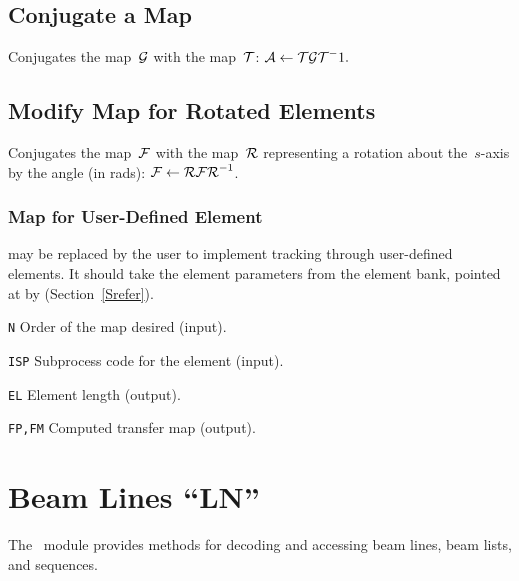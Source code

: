 \section{Conjugate a Map}
\label{LMSAND}
Conjugates the map~$\cal G$ with the map~$\cal T$:
${\cal A} \leftarrow {\cal T G T}^-1.$
 
\section{Modify Map for Rotated Elements}
\label{LMTILT}
Conjugates the map~$\cal F$ with the map~$\cal R$ representing a
rotation about the~$s$-axis by the angle  (in rads):
${\cal F} \leftarrow {\cal R F R}^{-1}$.
 
\subsection{Map for User-Defined Element}
\label{LMUSER}
may be replaced by the user to implement tracking through user-defined
elements.
It should take the element parameters from the element bank,
pointed at by  (Section~\ref{Srefer}).
\begin{mylist}
\item[\tt N] 
Order of the map desired (input).
\item[\tt ISP]
Subprocess code for the element (input).
\item[\tt EL]
Element length (output).
\item[\tt FP,FM]
Computed transfer map (output).
\end{mylist}


\chapter{Beam Lines ``LN''}
The ~module provides methods for decoding and accessing
beam lines, beam lists, and sequences.

